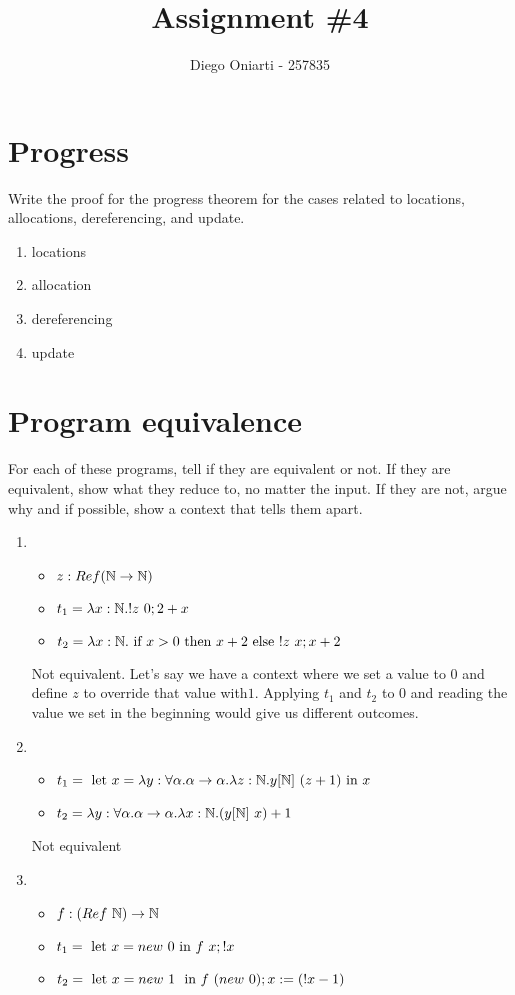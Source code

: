 \documentclass{article}
\title{Assignment \#4}
\author{Diego Oniarti - 257835}
\date{}
\begin{document}
\maketitle

\section{Progress}
Write the proof for the progress theorem for the cases related to locations, allocations, dereferencing, and update.
\begin{enumerate}
    \item locations
    \item allocation
    \item dereferencing
    \item update
\end{enumerate}

\section{Program equivalence}
For each of these programs, tell if they are equivalent or not. If they are equivalent, show what they reduce to, no matter the input. If they are not, argue why and if possible, show a context that tells them apart.
\begin{enumerate}
    \item
        \begin{itemize}
            \item $z:Ref(\mathbb N\to\mathbb N)$
            \item $t_1=\lam{x:\N}{!z\ 0;2+x}$
            \item $t_2=\lam{x:\N}{\IF x>0 \THEN x+2 \ELSE !z\ x;x+2}$
        \end{itemize}
        Not equivalent. Let's say we have a context where we set a value to $0$ and define $z$ to override that value with$1$. Applying $t_1$ and $t_2$ to $0$ and reading the value we set in the beginning would give us different outcomes.
    \item 
        \begin{itemize}
            \item $t_1= \LET x=\lam{y:\forall\alpha.\alpha\to\alpha}\lam{z:\N}{y[\N]\ (z+1)} \TIN x$
            \item $t_2= \lam{y:\forall\alpha.\alpha\to\alpha}\lam{x:\N}{(y[\N]\ x)+1}$
        \end{itemize}
        Not equivalent

    \item 
        \begin{itemize}
            \item $f:(Ref\ \mathbb N)\to\mathbb N$
            \item $t_1=\text{ let } x= new\ 0 \text{ in } f\ x; !x$
            \item $t_2=\text{ let } x= new\ 1\ \text{ in } f\ (new\ 0); x:=(!x-1)$
        \end{itemize}
\end{enumerate}
\end{document}
